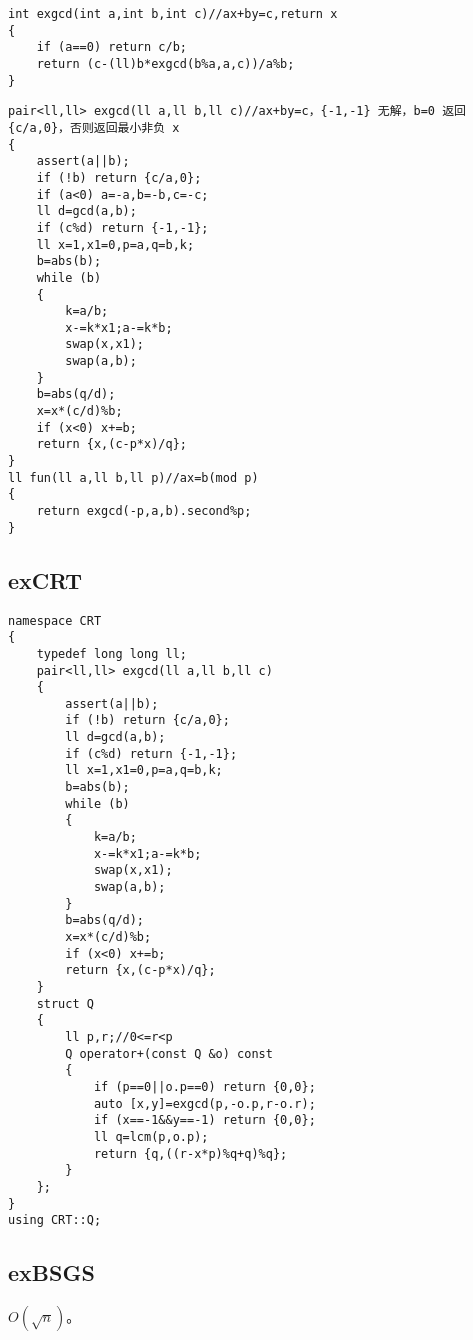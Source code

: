 \documentclass[12pt]{ctexart}
\begin{document}
\begin{lstlisting}
int exgcd(int a,int b,int c)//ax+by=c,return x
{
	if (a==0) return c/b;
	return (c-(ll)b*exgcd(b%a,a,c))/a%b;
}
\end{lstlisting}

\begin{lstlisting}
pair<ll,ll> exgcd(ll a,ll b,ll c)//ax+by=c，{-1,-1} 无解，b=0 返回 {c/a,0}，否则返回最小非负 x
{
	assert(a||b);
	if (!b) return {c/a,0};
	if (a<0) a=-a,b=-b,c=-c;
	ll d=gcd(a,b);
	if (c%d) return {-1,-1};
	ll x=1,x1=0,p=a,q=b,k;
	b=abs(b);
	while (b)
	{
		k=a/b;
		x-=k*x1;a-=k*b;
		swap(x,x1);
		swap(a,b);
	}
	b=abs(q/d);
	x=x*(c/d)%b;
	if (x<0) x+=b;
	return {x,(c-p*x)/q};
}
ll fun(ll a,ll b,ll p)//ax=b(mod p)
{
	return exgcd(-p,a,b).second%p;
}
\end{lstlisting}

\subsection{exCRT}

\begin{lstlisting}
namespace CRT
{
	typedef long long ll;
	pair<ll,ll> exgcd(ll a,ll b,ll c)
	{
		assert(a||b);
		if (!b) return {c/a,0};
		ll d=gcd(a,b);
		if (c%d) return {-1,-1};
		ll x=1,x1=0,p=a,q=b,k;
		b=abs(b);
		while (b)
		{
			k=a/b;
			x-=k*x1;a-=k*b;
			swap(x,x1);
			swap(a,b);
		}
		b=abs(q/d);
		x=x*(c/d)%b;
		if (x<0) x+=b;
		return {x,(c-p*x)/q};
	}
	struct Q
	{
		ll p,r;//0<=r<p
		Q operator+(const Q &o) const
		{
			if (p==0||o.p==0) return {0,0};
			auto [x,y]=exgcd(p,-o.p,r-o.r);
			if (x==-1&&y==-1) return {0,0};
			ll q=lcm(p,o.p);
			return {q,((r-x*p)%q+q)%q};
		}
	};
}
using CRT::Q;
\end{lstlisting}


\subsection{exBSGS}

$O(\sqrt n)$。
\end{document}
